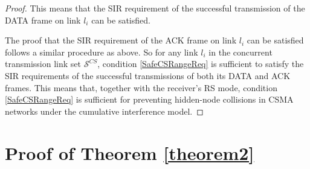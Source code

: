 \documentclass[conference]{IEEEtran}
\begin{document}
\begin{proof}
This means that the SIR requirement of the successful transmission
of the DATA frame on link $l_i$ can be satisf\/ied.

The proof that the SIR requirement of the ACK frame on link $l_i$
can be satisf\/ied follows a similar procedure as above. So for any
link $l_i$ in the concurrent transmission link set $\mathcal{S}^{
CS}$, condition \eqref{SafeCSRangeReq} is suff\/icient to satisfy
the SIR requirements of the successful transmissions of both its
DATA and ACK frames. This means that, together with the receiver's
RS mode, condition \eqref {SafeCSRangeReq} is suff\/icient for
preventing hidden-node collisions in CSMA networks under the
cumulative interference model.
\end{proof}

\section{Proof of Theorem \ref{theorem2}}\label{theorem2proof}
\end{document}
